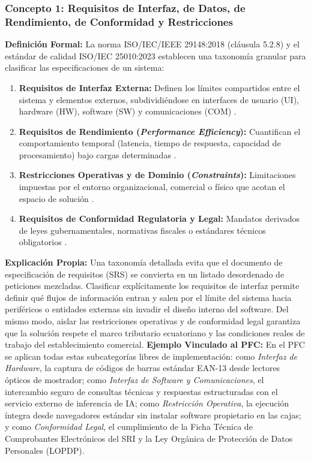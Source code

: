 \subsubsection{Concepto 1: Requisitos de Interfaz, de Datos, de Rendimiento, de Conformidad y Restricciones}
\textbf{Definición Formal:} La norma ISO/IEC/IEEE 29148:2018 (cláusula 5.2.8) \cite{ieee29148} y el estándar de calidad ISO/IEC 25010:2023 \cite{iso25010} establecen una taxonomía granular para clasificar las especificaciones de un sistema:
\begin{enumerate}
	\item \textbf{Requisitos de Interfaz Externa:} Definen los límites compartidos entre el sistema y elementos externos, subdividiéndose en interfaces de usuario (UI), hardware (HW), software (SW) y comunicaciones (COM) \cite{ieee29148}.
	\item \textbf{Requisitos de Rendimiento (\textit{Performance Efficiency}):} Cuantifican el comportamiento temporal (latencia, tiempo de respuesta, capacidad de procesamiento) bajo cargas determinadas \cite{iso25010}.
	\item \textbf{Restricciones Operativas y de Dominio (\textit{Constraints}):} Limitaciones impuestas por el entorno organizacional, comercial o físico que acotan el espacio de solución \cite{pohl2025, swebok2024}.
	\item \textbf{Requisitos de Conformidad Regulatoria y Legal:} Mandatos derivados de leyes gubernamentales, normativas fiscales o estándares técnicos obligatorios \cite{ieee29148, ireb2023}.
\end{enumerate}
\textbf{Explicación Propia:} Una taxonomía detallada evita que el documento de especificación de requisitos (SRS) se convierta en un listado desordenado de peticiones mezcladas. Clasificar explícitamente los requisitos de interfaz permite definir qué flujos de información entran y salen por el límite del sistema hacia periféricos o entidades externas sin invadir el diseño interno del software. Del mismo modo, aislar las restricciones operativas y de conformidad legal garantiza que la solución respete el marco tributario ecuatoriano y las condiciones reales de trabajo del establecimiento comercial.
\textbf{Ejemplo Vinculado al PFC:} En el PFC se aplican todas estas subcategorías libres de implementación: como \textit{Interfaz de Hardware}, la captura de códigos de barras estándar EAN-13 desde lectores ópticos de mostrador; como \textit{Interfaz de Software y Comunicaciones}, el intercambio seguro de consultas técnicas y respuestas estructuradas con el servicio externo de inferencia de IA; como \textit{Restricción Operativa}, la ejecución íntegra desde navegadores estándar sin instalar software propietario en las cajas; y como \textit{Conformidad Legal}, el cumplimiento de la Ficha Técnica de Comprobantes Electrónicos del SRI y la Ley Orgánica de Protección de Datos Personales (LOPDP).

